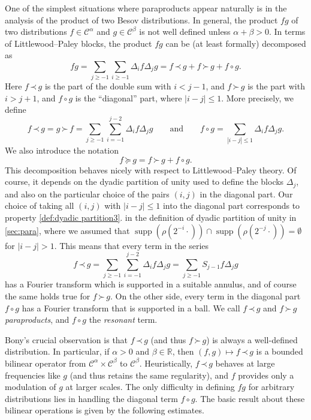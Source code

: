 \documentclass[a4paper,11pt]{article}
\newcommand{\cdummy}{\cdot}
\newcommand{\tmop}[1]{\ensuremath{\operatorname{#1}}}
\newcommand{\tmtextit}[1]{{\itshape{#1}}}
\theoremstyle{remark}
\newcommand{\CC}{\ensuremath{\mathscr{C}}}
\newcommand{\lpara}{\,\mathord{\prec}\,}
\newcommand{\rpara}{\,\mathord{\succ}\,}
\newcommand{\reso}{\,\mathord{\circ}\,}
\newcommand{\rparacurl}{\, \mathord{\succcurlyeq} \,}
\begin{document}
 One of the simplest situations where paraproducts appear naturally is in the analysis of the product of two Besov distributions. 
In general, the product $f g$ of two distributions $f \in \CC^{\alpha}$ and $g \in \CC^{\beta}$ is not well defined unless $\alpha + \beta >0$. In terms of Littlewood--Paley blocks, the product $f g$ can be (at least formally) decomposed as
\[
   fg= \sum_{j \geqslant -1} \sum_{i \geqslant -1} \Delta_{i} f \Delta_{j} g=f \lpara g+f \rpara g+f \reso g.
\]
Here $f \lpara g$ is the part of the double sum with $i<j-1$, and $f \rpara g$ is the part with $i>j+1$, and $f \reso g$ is the ``diagonal'' part, where $|i-j | \leqslant 1$. More precisely, we define
\[
   f \lpara g= g\rpara f = \sum_{j \geqslant -1} \sum_{i=-1}^{j-2} \Delta_{i} f \Delta_{j} g \qquad \text{and}\qquad
   f \reso g= \sum_{| i-j | \leqslant 1} \Delta_{i} f \Delta_{j} g.
\]
We also introduce the notation
\[
   f \rparacurl g=f \rpara g+f \reso g.
\]
This decomposition  behaves nicely with respect to Littlewood--Paley theory. Of course, it depends on the dyadic partition of unity used to define the blocks $\Delta_{j}$, and also on the particular choice of the pairs $( i,j )$ in the diagonal part. Our choice of taking all $(i,j)$ with $| i-j| \leqslant 1$ into the diagonal part corresponds to property \ref{def:dyadic partition3}. in the definition of dyadic partition of unity in \ref{sec:para},  where we assumed that $\tmop{supp} ( \rho ( 2^{-i} \cdummy ) ) \cap \tmop{supp} ( \rho ( 2^{-j} \cdummy ) ) = \emptyset$ for $| i-j | >1$. This means that every term in the series
\[
   f \lpara g = \sum_{j \geqslant -1} \sum_{i=-1}^{j-2} \Delta_{i} f \Delta_{j} g= \sum_{j \geqslant -1} S_{j-1} f \Delta_{j} g
\]
has a Fourier transform which is supported in a suitable annulus, and of course the same holds true for $f \rpara g$. On the other side, every term in the diagonal part $f \reso g$ has a Fourier transform that is supported in a ball. We call $f \lpara g$ and $f \rpara g$ \tmtextit{paraproducts}, and $f \reso g$ the \tmtextit{resonant} term.

Bony's crucial observation is that $f \lpara g$ (and thus $f \rpara g$) is always a well-defined distribution. In particular, if $\alpha >0$ and $\beta \in \mathbb{R}$, then $( f,g ) \mapsto f \lpara g$ is a bounded bilinear operator from $\CC^{\alpha} \times \CC^{\beta}$ to $\CC^{\beta}$. Heuristically, $f \lpara g$ behaves at large frequencies like $g$ (and thus retains the same regularity), and $f$ provides only a modulation of $g$ at larger scales. The only difficulty in defining $fg$ for arbitrary distributions lies in handling the diagonal term $f \reso g$. The basic result about these bilinear operations is given by the following estimates.
\end{document}
